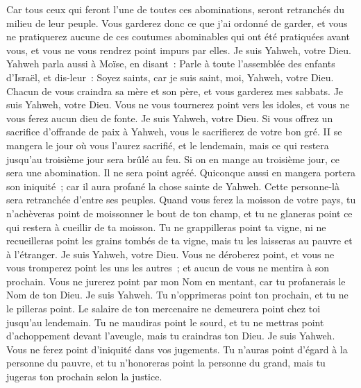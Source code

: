 \begin{multicols}{2}
Car tous ceux qui feront l'une de toutes ces abominations, seront retranchés du milieu de leur peuple.
Vous garderez donc ce que j'ai ordonné de garder, et vous ne pratiquerez aucune de ces coutumes abominables qui ont été pratiquées avant vous, et vous ne vous rendrez point impurs par elles. Je suis Yahweh, votre Dieu.
\VerseOne{}Yahweh parla aussi à Moïse, en disant~:
Parle à toute l'assemblée des enfants d'Israël, et dis-leur~: Soyez saints, car je suis saint, moi, Yahweh, votre Dieu.
Chacun de vous craindra sa mère et son père, et vous garderez mes sabbats. Je suis Yahweh, votre Dieu.
Vous ne vous tournerez point vers les idoles, et vous ne vous ferez aucun dieu de fonte. Je suis Yahweh, votre Dieu.
Si vous offrez un sacrifice d'offrande de paix à Yahweh, vous le sacrifierez de votre bon gré.
II se mangera le jour où vous l'aurez sacrifié, et le lendemain, mais ce qui restera jusqu'au troisième jour sera brûlé au feu.
Si on en mange au troisième jour, ce sera une abomination. Il ne sera point agréé.
Quiconque aussi en mangera portera son iniquité~; car il aura profané la chose sainte de Yahweh. Cette personne-là sera retranchée d'entre ses peuples.
Quand vous ferez la moisson de votre pays, tu n'achèveras point de moissonner le bout de ton champ, et tu ne glaneras point ce qui restera à cueillir de ta moisson.
Tu ne grappilleras point ta vigne, ni ne recueilleras point les grains tombés de ta vigne, mais tu les laisseras au pauvre et à l'étranger. Je suis Yahweh, votre Dieu.
Vous ne déroberez point, et vous ne vous tromperez point les uns les autres~; et aucun de vous ne mentira à son prochain.
Vous ne jurerez point par mon Nom en mentant, car tu profanerais le Nom de ton Dieu. Je suis Yahweh.
Tu n'opprimeras point ton prochain, et tu ne le pilleras point. Le salaire de ton mercenaire ne demeurera point chez toi jusqu'au lendemain.
Tu ne maudiras point le sourd, et tu ne mettras point d'achoppement devant l'aveugle, mais tu craindras ton Dieu. Je suis Yahweh.
Vous ne ferez point d'iniquité dans vos jugements. Tu n'auras point d'égard à la personne du pauvre, et tu n'honoreras point la personne du grand, mais tu jugeras ton prochain selon la justice.

\end{multicols}
